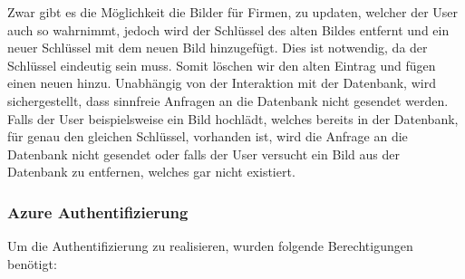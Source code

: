 Zwar gibt es die Möglichkeit die Bilder für Firmen, zu updaten, welcher der User auch so wahrnimmt, jedoch wird der Schlüssel des alten Bildes entfernt und ein neuer Schlüssel mit dem neuen Bild hinzugefügt.
Dies ist notwendig, da der Schlüssel eindeutig sein muss.
Somit löschen wir den alten Eintrag und fügen einen neuen hinzu.
Unabhängig von der Interaktion mit der Datenbank, wird sichergestellt, dass sinnfreie Anfragen an die Datenbank nicht gesendet werden.
Falls der User beispielsweise ein Bild hochlädt, welches bereits in der Datenbank, für genau den gleichen Schlüssel, vorhanden ist, wird die Anfrage an die Datenbank nicht gesendet oder falls der User versucht ein Bild aus der Datenbank zu entfernen, welches gar nicht existiert.
\newline
\newline
\subsubsection{Azure Authentifizierung}\label{subsubsec:Azure Authentifizierung}
Um die Authentifizierung zu realisieren, wurden folgende Berechtigungen benötigt:
\newline
\newline
    \centering
\small
